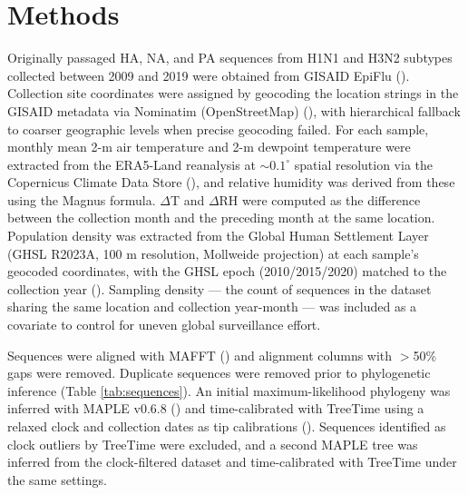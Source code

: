 \documentclass{pnas-new}
\begin{document}
\section*{Methods}

Originally passaged HA, NA, and PA sequences from H1N1 and H3N2 subtypes collected between 2009 and 2019 were obtained from GISAID EpiFlu (\cite{shu_gisaid_2017}). Collection site coordinates were assigned by geocoding the location strings in the GISAID metadata via Nominatim (OpenStreetMap) (\cite{noauthor_architecture_nodate, noauthor_openstreetmap_nodate}), with hierarchical fallback to coarser geographic levels when precise geocoding failed. For each sample, monthly mean 2-m air temperature and 2-m dewpoint temperature were extracted from the ERA5-Land reanalysis at ${\sim}0.1^\circ$ spatial resolution via the Copernicus Climate Data Store (\cite{noauthor_era5_nodate}), and relative humidity was derived from these using the Magnus formula. $\Delta$T and $\Delta$RH were computed as the difference between the collection month and the preceding month at the same location. Population density was extracted from the Global Human Settlement Layer (GHSL R2023A, 100 m resolution, Mollweide projection) at each sample's geocoded coordinates, with the GHSL epoch (2010/2015/2020) matched to the collection year (\cite{pesaresi_advances_2024}). Sampling density — the count of sequences in the dataset sharing the same location and collection year-month — was included as a covariate to control for uneven global surveillance effort.

Sequences were aligned with MAFFT (\cite{katoh_mafft_2013}) and alignment columns with $>$50\% gaps were removed. Duplicate sequences were removed prior to phylogenetic inference (Table \ref{tab:sequences}). An initial maximum-likelihood phylogeny was inferred with MAPLE v0.6.8 (\cite{de_maio_maximum_2022}) and time-calibrated with TreeTime using a relaxed clock and collection dates as tip calibrations (\cite{sagulenko_treetime_2018}). Sequences identified as clock outliers by TreeTime were excluded, and a second MAPLE tree was inferred from the clock-filtered dataset and time-calibrated with TreeTime under the same settings.
\end{document}
